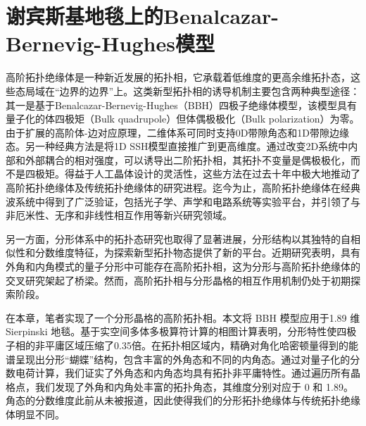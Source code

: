 \chapter{谢宾斯基地毯上的Benalcazar-Bernevig-Hughes模型}
高阶拓扑绝缘体是一种新近发展的拓扑相，它承载着低维度的更高余维拓扑态，这些态局域在“边界的边界”上\cite{benalcazar2017quantized,langbehn2017reflection,song2017d,schindler2018higher,ezawa2018higher,trifunovic2019higher,xie2021higher}。这类新型拓扑相的诱导机制主要包含两种典型途径：其一是基于Benalcazar-Bernevig-Hughes（BBH）四极子绝缘体模型\cite{benalcazar2017quantized}，该模型具有量子化的体四极矩（Bulk quadrupole）但体偶极极化（Bulk polarization）为零。由于扩展的高阶体-边对应原理，二维体系可同时支持0D带隙角态和1D带隙边缘态。另一种经典方法是将1D SSH模型直接推广到更高维度\cite{noh2018topological,ni2019observation,zhang2019second,xue2019acoustic,zhang2020low}。通过改变2D系统中内部和外部耦合的相对强度，可以诱导出二阶拓扑相，其拓扑不变量是偶极极化，而不是四极矩。得益于人工晶体设计的灵活性，这些方法在过去十年中极大地推动了高阶拓扑绝缘体及传统拓扑绝缘体\cite{hasan2010colloquium,qi2011topological}的研究进程。迄今为止，高阶拓扑绝缘体在经典波系统中得到了广泛验证，包括光子学\cite{peterson2018quantized,xie2018second,chen2019direct,xie2019visualization,mittal2019photonic,ota2019photonic,el2019corner,he2020quadrupole,zhang2020higher,li2020higher}、声学\cite{serra2018observation,zhang2019dimensional,xue2019realization,qi2020acoustic,xue2020observation,weiner2020demonstration,ni2020demonstration}和电路系统\cite{imhof2018topolectrical,bao2019topoelectrical,zhang2019dimensional,liu2020octupole,zhang2021experimental}等实验平台，并引领了与非厄米性\cite{luo2019higher,gao2021non}、无序\cite{zhang2021experimental,chen2020higher,li2020topological}和非线性\cite{zangeneh2019nonlinear,kirsch2021nonlinear}相互作用等新兴研究领域。

另一方面，分形体系中的拓扑态研究也取得了显著进展\cite{song2014topological,iliasov2020hall,fremling2020existence,yang2020photonic}，分形结构以其独特的自相似性和分数维度特征\cite{mandelbrot1967coast}，为探索新型拓扑物态提供了新的平台。近期研究表明，具有外角和内角模式的量子分形中可能存在高阶拓扑相\cite{pai2019topological,manna2022higher}，这为分形与高阶拓扑绝缘体的交叉研究架起了桥梁。然而，高阶拓扑相与分形晶格的相互作用机制仍处于初期探索阶段。

在本章，笔者实现了一个分形晶格的高阶拓扑相。本文将 BBH 模型应用于1.89 维 Sierpinski 地毯。基于实空间多体多极算符\cite{wheeler2019many,kang2019many}计算的相图计算表明，分形特性使四极子相的非平庸区域压缩了0.35倍。在拓扑相区域内，精确对角化哈密顿量得到的能谱呈现出分形“蝴蝶”结构，包含丰富的外角态和不同的内角态。通过对量子化的分数电荷计算\cite{li2020fractional,peterson2021trapped,liu2021bulk}，我们证实了外角态和内角态均具有拓扑非平庸特性。通过遍历所有晶格点，我们发现了外角和内角处丰富的拓扑角态，其维度分别对应于 0 和 1.89。角态的分数维度此前从未被报道，因此使得我们的分形拓扑绝缘体与传统拓扑绝缘体明显不同。
